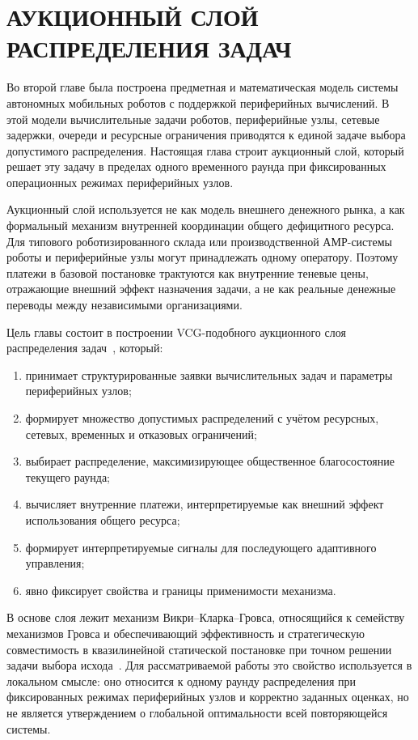 \chapter{АУКЦИОННЫЙ СЛОЙ РАСПРЕДЕЛЕНИЯ ЗАДАЧ}
\label{ch:ch3}

Во второй главе была построена предметная и математическая модель системы автономных мобильных роботов с поддержкой периферийных вычислений. В этой модели вычислительные задачи роботов, периферийные узлы, сетевые задержки, очереди и ресурсные ограничения приводятся к единой задаче выбора допустимого распределения. Настоящая глава строит аукционный слой, который решает эту задачу в пределах одного временного раунда при фиксированных операционных режимах периферийных узлов.

Аукционный слой используется не как модель внешнего денежного рынка, а как формальный механизм внутренней координации общего дефицитного ресурса. Для типового роботизированного склада или производственной АМР-системы роботы и периферийные узлы могут принадлежать одному оператору. Поэтому платежи в базовой постановке трактуются как внутренние теневые цены, отражающие внешний эффект назначения задачи, а не как реальные денежные переводы между независимыми организациями.

Цель главы состоит в построении VCG-подобного аукционного слоя распределения задач~\cite{Tereschenko2026MAVCG}, который:
\begin{enumerate}
    \item принимает структурированные заявки вычислительных задач и параметры периферийных узлов;
    \item формирует множество допустимых распределений с учётом ресурсных, сетевых, временных и отказовых ограничений;
    \item выбирает распределение, максимизирующее общественное благосостояние текущего раунда;
    \item вычисляет внутренние платежи, интерпретируемые как внешний эффект использования общего ресурса;
    \item формирует интерпретируемые сигналы для последующего адаптивного управления;
    \item явно фиксирует свойства и границы применимости механизма.
\end{enumerate}

В основе слоя лежит механизм Викри--Кларка--Гровса, относящийся к семейству механизмов Гровса и обеспечивающий эффективность и стратегическую совместимость в квазилинейной статической постановке при точном решении задачи выбора исхода~\cite{Vickrey1961Counterspeculation,Clarke1971MultipartPricing,Groves1973IncentivesTeams,Nisan2007AlgorithmicGameTheory}. Для рассматриваемой работы это свойство используется в локальном смысле: оно относится к одному раунду распределения при фиксированных режимах периферийных узлов и корректно заданных оценках, но не является утверждением о глобальной оптимальности всей повторяющейся системы.

